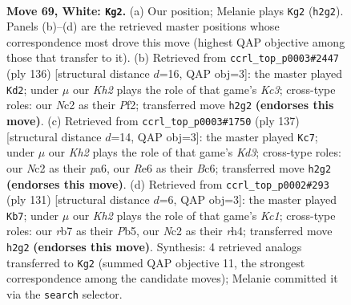 \documentclass[11pt]{article}
\begin{document}
\clearpage

\begin{figure}[p]\centering
\begin{subfigure}{0.46\textwidth}\centering
\resizebox{\linewidth}{!}{%
\newchessgame
\chessboard[
  setfen={6k1/1r4b1/4R3/R7/2P5/8/2N4K/8 w - - 58 69},
  showmover=false,
  pgfstyle=straightmove, color=movearrow, markmove={h2-g2}
]}
\caption{}
\end{subfigure}\hfill
\begin{subfigure}{0.46\textwidth}\centering
\resizebox{\linewidth}{!}{%
\newchessgame
\chessboard[
  setfen={8/1r6/R7/3bk3/8/2K5/5P2/8 w - - 4 69},
  showmover=false,
  pgfstyle=straightmove, color=movearrow, markmove={c3-d2}
]}
\caption{}
\end{subfigure}
\\[4pt]
\begin{subfigure}{0.46\textwidth}\centering
\resizebox{\linewidth}{!}{%
\newchessgame
\chessboard[
  setfen={1R6/8/P1bk4/8/7r/KB6/8/8 b - - 2 69},
  showmover=false,
  pgfstyle=straightmove, color=movearrow, markmove={d6-c7}
]}
\caption{}
\end{subfigure}\hfill
\begin{subfigure}{0.46\textwidth}\centering
\resizebox{\linewidth}{!}{%
\newchessgame
\chessboard[
  setfen={2k5/8/8/1p6/4KB1R/P7/8/3r4 b - - 0 66},
  showmover=false,
  pgfstyle=straightmove, color=movearrow, markmove={c8-b7}
]}
\caption{}
\end{subfigure}
\caption{\textbf{Move 69, White: \texttt{Kg2}.} (a) Our position; Melanie plays \texttt{Kg2} (\texttt{h2g2}). Panels (b)--(d) are the retrieved master positions whose correspondence most drove this move (highest QAP objective among those that transfer to it). (b) Retrieved from \texttt{ccrl\_top\_p0003\#2447} (ply 136) [structural distance $d$=16, QAP obj=3]: the master played \texttt{Kd2}; under $\mu$ our \emph{Kh2} plays the role of that game's \emph{Kc3}; cross-type roles: our \emph{N}c2 as their \emph{P}f2; transferred move \texttt{h2g2} \textbf{(endorses this move)}. (c) Retrieved from \texttt{ccrl\_top\_p0003\#1750} (ply 137) [structural distance $d$=14, QAP obj=3]: the master played \texttt{Kc7}; under $\mu$ our \emph{Kh2} plays the role of that game's \emph{Kd3}; cross-type roles: our \emph{N}c2 as their \emph{p}a6, our \emph{R}e6 as their \emph{B}c6; transferred move \texttt{h2g2} \textbf{(endorses this move)}. (d) Retrieved from \texttt{ccrl\_top\_p0002\#293} (ply 131) [structural distance $d$=6, QAP obj=3]: the master played \texttt{Kb7}; under $\mu$ our \emph{Kh2} plays the role of that game's \emph{Kc1}; cross-type roles: our \emph{r}b7 as their \emph{P}b5, our \emph{N}c2 as their \emph{r}h4; transferred move \texttt{h2g2} \textbf{(endorses this move)}. Synthesis: 4 retrieved analogs transferred to \texttt{Kg2} (summed QAP objective 11, the strongest correspondence among the candidate moves); Melanie committed it via the \texttt{search} selector.}
\label{fig:thought-m136}
\end{figure}
\end{document}
